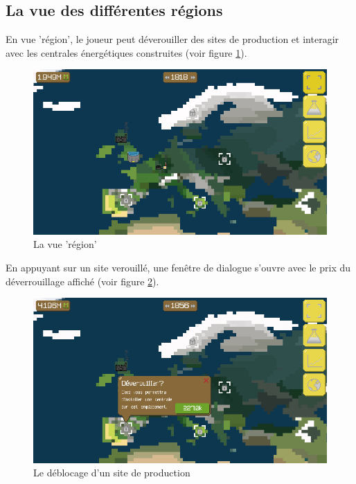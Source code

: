 \documentclass{article}
\begin{document}
		\subsection{La vue des différentes régions} \label{regionView}
		En vue 'région', le joueur peut déverouiller des sites de production et interagir avec les centrales énergétiques construites (voir figure \ref{fig:region}).
		\begin{figure}[H]
                \includegraphics[width=\linewidth]{../images/region}
                \caption{La vue 'région'}
                \label{fig:region}
        \end{figure}
        
        En appuyant sur un site verouillé, une fenêtre de dialogue s'ouvre avec le prix du déverrouillage affiché (voir figure \ref{fig:unlockSite}).
        \begin{figure}[H]
                \includegraphics[width=\linewidth]{../images/unlockSite}
                \caption{Le déblocage d'un site de production}
                \label{fig:unlockSite}
        \end{figure}
        
\end{document}

